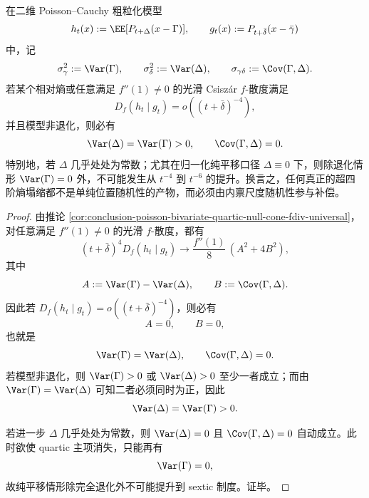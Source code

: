 \begin{theorem}[超四阶熵塌缩要求非平凡尺度随机性参与补偿]\label{thm:conclusion-poisson-cauchy-superquartic-collapse-needs-scale-randomness}
在二维 Poisson--Cauchy 粗粒化模型
\[
h_t(x):=\EE[P_{t+\Delta}(x-\Gamma)],
\qquad
g_t(x):=P_{t+\bar\delta}(x-\bar\gamma)
\]
中，记
\[
\sigma_\gamma^2:=\Var(\Gamma),
\qquad
\sigma_\delta^2:=\Var(\Delta),
\qquad
\sigma_{\gamma\delta}:=\Cov(\Gamma,\Delta).
\]
若某个相对熵或任意满足 \(f''(1)\neq 0\) 的光滑 Csisz\'ar \(f\)-散度满足
\[
D_f(h_t\mid g_t)=o((t+\bar\delta)^{-4}),
\]
并且模型非退化，则必有
\[
\Var(\Delta)=\Var(\Gamma)>0,
\qquad
\Cov(\Gamma,\Delta)=0.
\]
特别地，若 \(\Delta\) 几乎处处为常数；尤其在归一化纯平移口径 \(\Delta\equiv 0\) 下，则除退化情形 \(\Var(\Gamma)=0\) 外，不可能发生从 \(t^{-4}\) 到 \(t^{-6}\) 的提升。换言之，任何真正的超四阶熵塌缩都不是单纯位置随机性的产物，而必须由内禀尺度随机性参与补偿。
\end{theorem}
\begin{proof}
由推论 \ref{cor:conclusion-poisson-bivariate-quartic-null-cone-fdiv-universal}，对任意满足 \(f''(1)\neq 0\) 的光滑 \(f\)-散度，都有
\[
(t+\bar\delta)^4D_f(h_t\mid g_t)\longrightarrow \frac{f''(1)}{8}\,(A^2+4B^2),
\]
其中
\[
A:=\Var(\Gamma)-\Var(\Delta),
\qquad
B:=\Cov(\Gamma,\Delta).
\]
因此若 \(D_f(h_t\mid g_t)=o((t+\bar\delta)^{-4})\)，则必有
\[
A=0,
\qquad
B=0,
\]
也就是
\[
\Var(\Gamma)=\Var(\Delta),
\qquad
\Cov(\Gamma,\Delta)=0.
\]
若模型非退化，则 \(\Var(\Gamma)>0\) 或 \(\Var(\Delta)>0\) 至少一者成立；而由 \(\Var(\Gamma)=\Var(\Delta)\) 可知二者必须同时为正，因此
\[
\Var(\Delta)=\Var(\Gamma)>0.
\]

若进一步 \(\Delta\) 几乎处处为常数，则 \(\Var(\Delta)=0\) 且 \(\Cov(\Gamma,\Delta)=0\) 自动成立。此时欲使 quartic 主项消失，只能再有
\[
\Var(\Gamma)=0,
\]
故纯平移情形除完全退化外不可能提升到 sextic 制度。证毕。
\end{proof}

